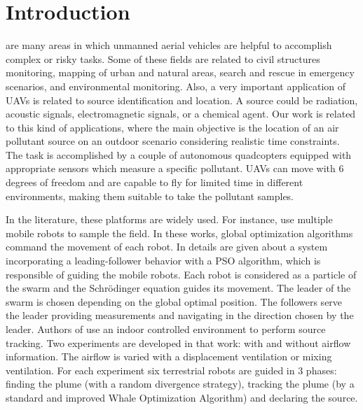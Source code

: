 \section{Introduction}
\label{sec:intro}
 are many areas in which unmanned aerial vehicles are helpful to accomplish complex or risky tasks. 
Some of these fields are related to civil structures monitoring, mapping of urban and natural areas, search and rescue in emergency scenarios, and environmental monitoring. 
Also, a very important application of UAVs is related to source identification and location. 
A source could be radiation, acoustic signals, electromagnetic signals, or a chemical agent. 
Our work is related to this kind of applications, where the main objective is the location of an air pollutant source on an outdoor scenario considering realistic time constraints. 
The task is accomplished by a couple of autonomous quadcopters equipped with appropriate sensors which measure a specific pollutant. 
UAVs can move with 6 degrees of freedom and are capable to fly for limited time in different environments, making them suitable to take the pollutant samples.

In the literature, these  platforms are widely used.
For instance, \cite{li2020multi, yang2019towards, zou2015particle, nickels2019effective, chen2020combining, feng2019source} use multiple mobile robots to sample the field. 
In these works, global optimization algorithms command the movement of each robot. 
In \cite{li2020multi} details are given about a system incorporating a leading-follower behavior with a PSO algorithm, which is responsible of guiding the mobile robots. 
Each robot is considered as a particle of the swarm and the Schrödinger equation guides its movement.
The leader of the swarm is chosen depending on the global optimal position. 
The followers serve the leader providing measurements and navigating in the direction chosen by the leader. 
Authors of \cite{yang2019towards} use an indoor controlled environment to perform  source tracking. 
Two experiments are developed in that work: with and without airflow information. 
The airflow is varied with a displacement ventilation or mixing ventilation. 
For each experiment six terrestrial robots are guided in 3 phases: finding the plume (with a random divergence strategy), tracking the plume (by a standard and improved Whale Optimization Algorithm) and declaring the source.

